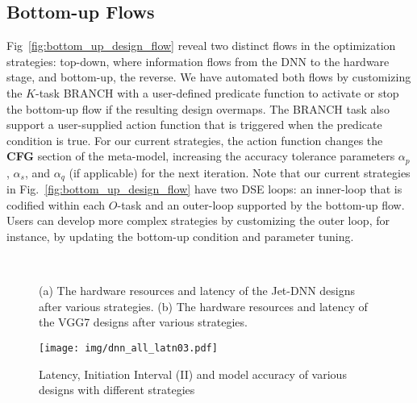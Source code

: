 \subsection{Bottom-up Flows}
\label{sec:bottom_up}
Fig~\ref{fig:bottom_up_design_flow} reveal two distinct flows in the optimization strategies: top-down, where information flows from the DNN to the hardware stage, and bottom-up, the reverse. We have automated both flows by customizing the $K$-task BRANCH with a user-defined predicate function to activate or stop the bottom-up flow if the resulting design overmaps. The BRANCH task also support a user-supplied action function that is triggered when the predicate condition is true. For our current strategies, the action function changes the \textbf{CFG} section of the meta-model, increasing the accuracy tolerance parameters $\alpha_{p}$, $\alpha_{s}$, and $\alpha_{q}$ (if applicable) for the next iteration. Note that our current strategies in Fig.~\ref{fig:bottom_up_design_flow} have two DSE loops: an inner-loop that is codified within each $O$-task and an outer-loop supported by the bottom-up flow. Users can develop more complex strategies by customizing the outer loop, for instance, by updating the bottom-up condition and parameter tuning.



\begin{figure} 
   \centering
   \hspace*{\fill}
   \hspace*{\fill}
   \\
   \hspace*{\fill}
  \hspace*{\fill}
  \caption{(a) The hardware resources and latency of the Jet-DNN designs after various strategies. (b) The hardware resources and latency of the VGG7 designs after various strategies.}
  \label{fig:dnn_vgg7_all_resource} 
\end{figure}

\begin{figure}
\begin{center}
\texttt{[image: img/dnn\_all\_latn03.pdf]}
\end{center}
   \caption{Latency, Initiation Interval (II) and model accuracy of various designs with different strategies}
\label{fig:dnn_all_latency}

\end{figure}

